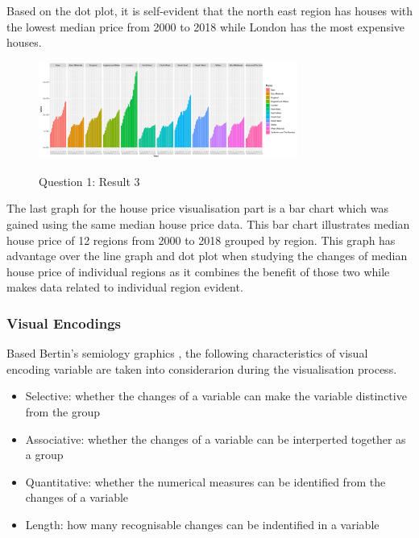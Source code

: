 \documentclass{article}
\begin{document}
Based on the dot plot, it is self-evident that the north east region has houses with the lowest median price 
from 2000 to 2018 while London has the most expensive houses.

\begin{figure}[H]
  \begin{minipage}[b]{1.0\linewidth}
    \centering
    \centerline{\includegraphics[width=8.5cm]{Q1Geom_gridbar}}
    \centerline{Question 1: Result 3}\medskip
  \end{minipage}
\end{figure}

The last graph for the house price visualisation part is a bar chart which was gained using the same 
median house price data. This bar chart illustrates median house price of 12 regions from 2000 to 2018 
grouped by region. This graph has advantage over the line graph and dot plot when studying the changes of median house price of individual 
regions as it combines the benefit of those two while makes data related to individual region evident.

\subsubsection{Visual Encodings}
Based Bertin's semiology graphics \cite{BertinJacques}, the following characteristics of visual encoding variable 
are taken into considerarion during the visualisation process. 

\begin{itemize}
  \item Selective:
        whether the changes of a variable can make the variable distinctive from the group
  \item Associative:
        whether the changes of a variable can be interperted together as a group
  \item Quantitative: 
        whether the numerical measures can be identified from the changes of a variable
  \item Length:
        how many recognisable changes can be indentified in a variable
\end{itemize}
\end{document}
